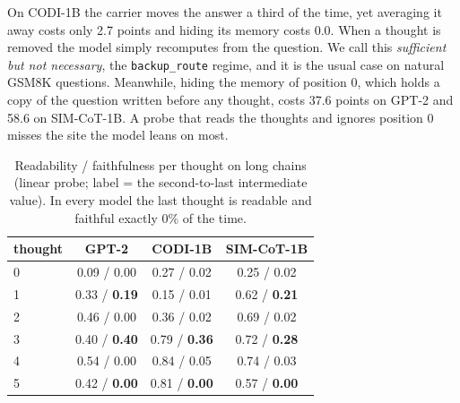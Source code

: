 \documentclass{article}
\begin{document}
\begin{finding}
On CODI-1B the carrier moves the answer a third of the time, yet averaging it away costs only 2.7 points and hiding its memory costs 0.0. When a thought is removed the model simply recomputes from the question. We call this \emph{sufficient but not necessary}, the \texttt{backup\_route} regime, and it is the usual case on natural GSM8K questions. Meanwhile, hiding the memory of position 0, which holds a copy of the question written before any thought, costs 37.6 points on GPT-2 and 58.6 on SIM-CoT-1B. A probe that reads the thoughts and ignores position 0 misses the site the model leans on most.
\end{finding}

\begin{table}[h]
\caption{Readability / faithfulness per thought on long chains (linear probe; label = the second-to-last intermediate value). In every model the last thought is readable and faithful exactly 0\% of the time.}
\label{tab:faith}
\centering\small
\begin{tabular}{lccc}
\toprule
thought & GPT-2 & CODI-1B & SIM-CoT-1B \\
\midrule
0 & 0.09 / 0.00 & 0.27 / 0.02 & 0.25 / 0.02 \\
1 & 0.33 / \textbf{0.19} & 0.15 / 0.01 & 0.62 / \textbf{0.21} \\
2 & 0.46 / 0.00 & 0.36 / 0.02 & 0.69 / 0.02 \\
3 & 0.40 / \textbf{0.40} & 0.79 / \textbf{0.36} & 0.72 / \textbf{0.28} \\
4 & 0.54 / 0.00 & 0.84 / 0.05 & 0.74 / 0.03 \\
5 & 0.42 / \textbf{0.00} & 0.81 / \textbf{0.00} & 0.57 / \textbf{0.00} \\
\bottomrule
\end{tabular}
\end{table}
\end{document}
